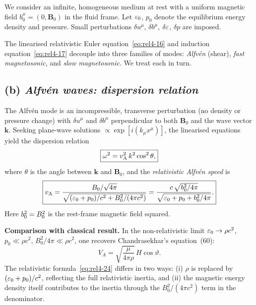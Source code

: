We consider an infinite, homogeneous medium at rest with a uniform magnetic
field $b^{\mu}_{0}=(0,\mathbf{B}_{0})$ in the fluid frame.  Let
$\varepsilon_{0}$, $p_{0}$ denote the equilibrium energy density and
pressure.  Small perturbations $\delta u^{\mu}$, $\delta b^{\mu}$,
$\delta\varepsilon$, $\delta p$ are imposed.

The linearised relativistic Euler equation~\eqref{eq:rel4-16} and induction
equation~\eqref{eq:rel4-17} decouple into three families of modes:
\emph{Alfv\'en} (shear), \emph{fast magnetosonic}, and \emph{slow
magnetosonic}.  We treat each in turn.

\subsection*{(b) \emph{Alfv\'en waves: dispersion relation}}

The Alfv\'en mode is an incompressible, transverse perturbation (no density
or pressure change) with $\delta u^{\mu}$ and $\delta b^{\mu}$
perpendicular to both $\mathbf{B}_{0}$ and the wave vector $\mathbf{k}$.
Seeking plane-wave solutions $\propto\exp[i(k_{\mu}x^{\mu})]$, the
linearised equations yield the dispersion relation
\begin{equation}\label{eq:rel4-23}
  \boxed{
  \omega^{2} = v_{\mathrm{A}}^{2}\,k^{2}\cos^{2}\theta,
  }
\end{equation}
where $\theta$ is the angle between $\mathbf{k}$ and $\mathbf{B}_{0}$,
and the \emph{relativistic Alfv\'en speed} is
\begin{equation}\label{eq:rel4-24}
  \boxed{
  v_{\mathrm{A}} = \frac{B_{0}/\sqrt{4\pi}}
    {\sqrt{(\varepsilon_{0}+p_{0})/c^{2} + B_{0}^{2}/(4\pi c^{2})}}
  = \frac{c\,\sqrt{b^2_{0}/4\pi}}
    {\sqrt{\varepsilon_{0}+p_{0}+b^2_{0}/4\pi}}.
  }
\end{equation}
Here $b^2_{0}=B_{0}^{2}$ is the rest-frame magnetic field squared.

\begin{relcorrection}
\textbf{Comparison with classical result.}
In the non-relativistic limit $\varepsilon_{0}\to\rho c^{2}$,
$p_{0}\ll\rho c^{2}$, $B_{0}^{2}/4\pi\ll\rho c^{2}$, one recovers
Chandrasekhar's equation~(60):
\[
  V_{A} = \sqrt{\frac{\mu}{4\pi\rho}}\,H\cos\vartheta.
\]
The relativistic formula~\eqref{eq:rel4-24} differs in two ways:
(i) $\rho$ is replaced by $(\varepsilon_{0}+p_{0})/c^{2}$, reflecting
the full relativistic inertia, and (ii) the magnetic energy density itself
contributes to the inertia through the $B_{0}^{2}/(4\pi c^{2})$ term in
the denominator.
\end{relcorrection}

